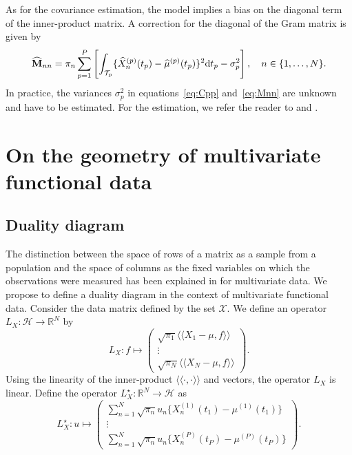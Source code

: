 \documentclass[times,sort&compress,3p]{elsarticle}
\theoremstyle{plain}%
\theoremstyle{definition}
\newcommand{\RR}{\mathbb{R}} %
\newcommand{\dd}{{\rm d}}
\newcommand{\TT}[1]{\mathcal{T}_{#1}} %
\newcommand{\HH}{\mathcal{H}} %
\newcommand{\inH}[2]{\langle\!\langle#1, #2\rangle\!\rangle}
\newcommand{\hatXnp}[1]{\widehat{X}_n^{(#1)}} %
\newcommand{\mup}[1]{\mu^{(#1)}} %
\begin{document}
As for the covariance estimation, the model implies a bias on the diagonal term of the inner-product matrix. A correction for the diagonal of the Gram matrix is given by
\begin{equation}\label{eq:Mnn}
    \widehat{\mathbf{M}}_{nn} = \pi_n\sum_{p = 1}^P \left[\int_{\TT{p}}\{\hatXnp{p}(t_p) - \widehat{\mu}^{(p)}(t_p)\}^2 \dd t_p - \sigma_p^2 \right], \quad n \in \{1, \dots, N\}.
\end{equation}
In practice, the variances $\sigma_p^2$ in equations~\eqref{eq:Cpp} and~\eqref{eq:Mnn} are unknown and have to be estimated. For the estimation, we refer the reader to \cite{hallAsymptoticallyOptimalDifferenceBased1990} and \cite{hallVarianceEstimationNonparametric1990}.



\section{On the geometry of multivariate functional data} %
\label{sec:geometric_point_of_view_mfpca}

\subsection{Duality diagram} %
\label{sub:duality_diagram}

The distinction between the space of rows of a matrix as a sample from a population and the space of columns as the fixed variables on which the observations were measured has been explained in \cite{delacruzDualityDiagramData2011,holmesMultivariateDataAnalysis2008} for multivariate data. We propose to define a duality diagram in the context of multivariate functional data. Consider the data matrix defined by the set $\mathcal{X}$. We define an operator $L_X : \HH \rightarrow \RR^N$ by
\begin{equation}
    L_X: f \mapsto \begin{pmatrix}
        \sqrt{\pi_1}\inH{X_1 - \mu}{f} \\
        \vdots \\
        \sqrt{\pi_N}\inH{X_N - \mu}{f}
    \end{pmatrix}.
\end{equation}
Using the linearity of the inner-product $\inH{\cdot}{\cdot}$ and vectors, the operator $L_X$ is linear. Define the operator $L^\star_X : \RR^N \rightarrow \HH$ as
\begin{equation}
    L^\star_X: u \mapsto \begin{pmatrix}
       \sum_{n = 1}^N \sqrt{\pi_n} u_n \{X_n^{(1)}(t_1) - \mup{1}(t_1)\} \\ 
       \vdots \\ 
       \sum_{n = 1}^N \sqrt{\pi_n} u_n \{X_n^{(P)}(t_P) - \mup{P}(t_P)\}
    \end{pmatrix}.
\end{equation}
\end{document}
